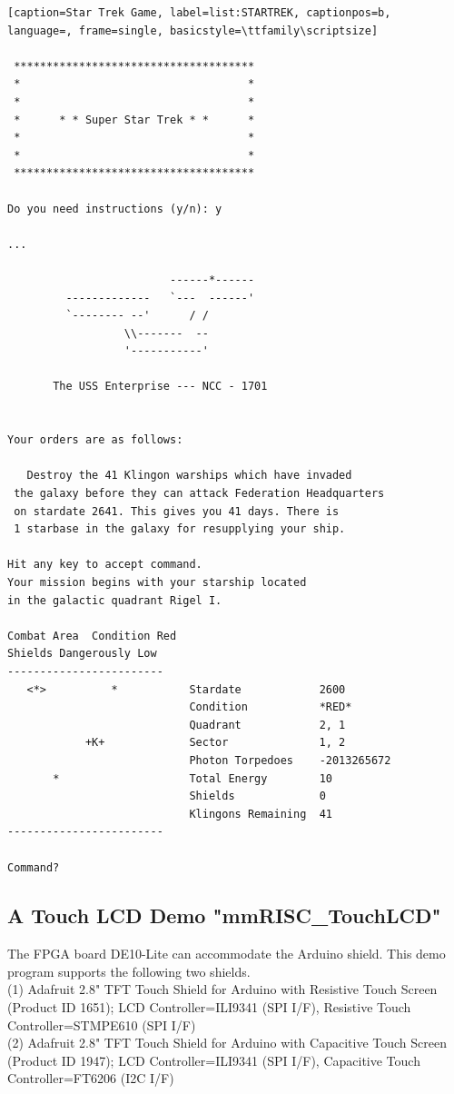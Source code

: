 \begin{lstlisting}[caption=Star Trek Game, label=list:STARTREK, captionpos=b,  language=, frame=single, basicstyle=\ttfamily\scriptsize]

 *************************************
 *                                   *
 *                                   *
 *      * * Super Star Trek * *      *
 *                                   *
 *                                   *
 *************************************

Do you need instructions (y/n): y

...

                         ------*------
         -------------   `---  ------'
         `-------- --'      / /
                  \\-------  --
                  '-----------'

       The USS Enterprise --- NCC - 1701


Your orders are as follows:

   Destroy the 41 Klingon warships which have invaded
 the galaxy before they can attack Federation Headquarters
 on stardate 2641. This gives you 41 days. There is
 1 starbase in the galaxy for resupplying your ship.

Hit any key to accept command. 
Your mission begins with your starship located
in the galactic quadrant Rigel I.

Combat Area  Condition Red
Shields Dangerously Low
------------------------
   <*>          *           Stardate            2600
                            Condition           *RED*
                            Quadrant            2, 1
            +K+             Sector              1, 2
                            Photon Torpedoes    -2013265672
       *                    Total Energy        10
                            Shields             0
                            Klingons Remaining  41
------------------------

Command? 
\end{lstlisting}

\subsection{A Touch LCD Demo "mmRISC\_TouchLCD"}
The FPGA board DE10-Lite can accommodate the Arduino shield. This demo program supports the following two shields.\\
(1) Adafruit 2.8" TFT Touch Shield for Arduino with Resistive Touch Screen (Product ID 1651); LCD Controller=ILI9341 (SPI I/F), Resistive Touch Controller=STMPE610 (SPI I/F)\\
(2) Adafruit 2.8" TFT Touch Shield for Arduino with Capacitive Touch Screen (Product ID 1947); LCD Controller=ILI9341 (SPI I/F), Capacitive Touch Controller=FT6206 (I2C I/F)


